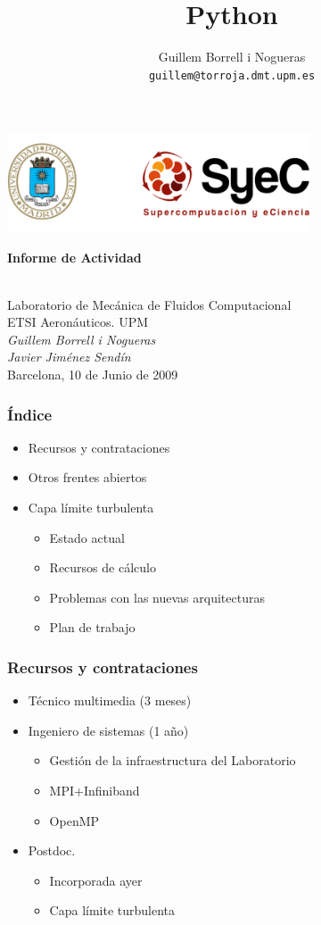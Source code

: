 \documentclass{beamer}
\title{Python}
\author{
Guillem Borrell i Nogueras\\
\texttt{guillem@torroja.dmt.upm.es}
}
\begin{document}
\begin{frame}
\begin{center}
 \includegraphics[width=9cm]{files/header.png}\\
\begin{large}
\textbf{Informe de Actividad}
\end{large}\\
Laboratorio de Mecánica de Fluidos Computacional\\
ETSI Aeronáuticos. UPM\\
\vspace{0.5cm}
\textit{Guillem Borrell i Nogueras}\\
\textit{Javier Jiménez Sendín}\\
Barcelona, 10 de Junio de 2009
\end{center}

\end{frame}


\begin{frame}
\frametitle{Índice}
\begin{itemize}
\item Recursos y contrataciones
\item Otros frentes abiertos
\item Capa límite turbulenta
\begin{itemize}
\item Estado actual
\item Recursos de cálculo
\item Problemas con las nuevas arquitecturas
\item Plan de trabajo
\end{itemize}
\end{itemize}
\end{frame}

\begin{frame}
\frametitle{Recursos y contrataciones}
\begin{itemize}
\item Técnico multimedia (3 meses)
\item Ingeniero de sistemas (1 año)
\begin{itemize}
\item Gestión de la infraestructura del Laboratorio
\item MPI+Infiniband
\item OpenMP
\end{itemize}
\item Postdoc.
\begin{itemize}
\item Incorporada ayer
\item Capa límite turbulenta
\end{itemize}
\end{itemize}
\end{frame}
\end{document}
